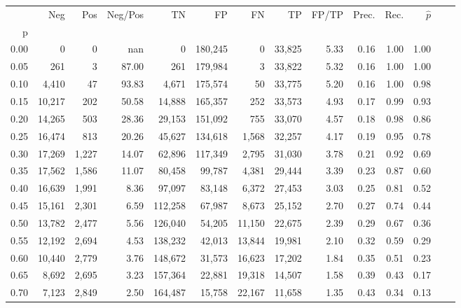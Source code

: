 \begin{tabular}{rrrrrrrrrrrrrr}
\toprule
{} &     Neg &    Pos & Neg/Pos &       TN &       FP &      FN &      TP & FP/TP & Prec. &  Rec. & $\hat{p}$ \\
p    &         &        &         &          &          &         &         &       &       &       &           \\
\midrule
0.00 &       0 &      0 &     nan &        0 &  180,245 &       0 &  33,825 &  5.33 &  0.16 &  1.00 &      1.00 \\
0.05 &     261 &      3 &   87.00 &      261 &  179,984 &       3 &  33,822 &  5.32 &  0.16 &  1.00 &      1.00 \\
0.10 &   4,410 &     47 &   93.83 &    4,671 &  175,574 &      50 &  33,775 &  5.20 &  0.16 &  1.00 &      0.98 \\
0.15 &  10,217 &    202 &   50.58 &   14,888 &  165,357 &     252 &  33,573 &  4.93 &  0.17 &  0.99 &      0.93 \\
0.20 &  14,265 &    503 &   28.36 &   29,153 &  151,092 &     755 &  33,070 &  4.57 &  0.18 &  0.98 &      0.86 \\
0.25 &  16,474 &    813 &   20.26 &   45,627 &  134,618 &   1,568 &  32,257 &  4.17 &  0.19 &  0.95 &      0.78 \\
0.30 &  17,269 &  1,227 &   14.07 &   62,896 &  117,349 &   2,795 &  31,030 &  3.78 &  0.21 &  0.92 &      0.69 \\
0.35 &  17,562 &  1,586 &   11.07 &   80,458 &   99,787 &   4,381 &  29,444 &  3.39 &  0.23 &  0.87 &      0.60 \\
0.40 &  16,639 &  1,991 &    8.36 &   97,097 &   83,148 &   6,372 &  27,453 &  3.03 &  0.25 &  0.81 &      0.52 \\
0.45 &  15,161 &  2,301 &    6.59 &  112,258 &   67,987 &   8,673 &  25,152 &  2.70 &  0.27 &  0.74 &      0.44 \\
0.50 &  13,782 &  2,477 &    5.56 &  126,040 &   54,205 &  11,150 &  22,675 &  2.39 &  0.29 &  0.67 &      0.36 \\
0.55 &  12,192 &  2,694 &    4.53 &  138,232 &   42,013 &  13,844 &  19,981 &  2.10 &  0.32 &  0.59 &      0.29 \\
0.60 &  10,440 &  2,779 &    3.76 &  148,672 &   31,573 &  16,623 &  17,202 &  1.84 &  0.35 &  0.51 &      0.23 \\
0.65 &   8,692 &  2,695 &    3.23 &  157,364 &   22,881 &  19,318 &  14,507 &  1.58 &  0.39 &  0.43 &      0.17 \\
0.70 &   7,123 &  2,849 &    2.50 &  164,487 &   15,758 &  22,167 &  11,658 &  1.35 &  0.43 &  0.34 &      0.13 \\

\end{tabular}
